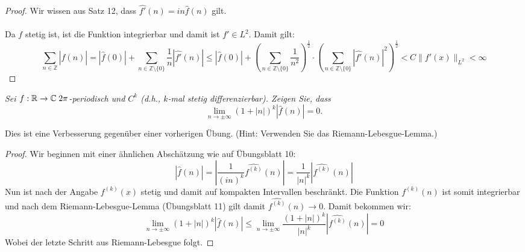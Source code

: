 \documentclass[11pt]{article}
\newcommand{\Z}{\mathbb{Z}}
\newenvironment{problem}[2][Beispiel]{
    \begin{trivlist}
        \item[\hskip \labelsep {\bfseries #1}\hskip \labelsep {\bfseries #2.}] \itshape}{
    \end{trivlist}\normalshape
}
\begin{document}
    \begin{proof}
        Wir wissen aus Satz 12, dass $\hat{f'}(n)=in\hat{f}(n)$ gilt.\\\\
        Da $f$ stetig ist, ist die Funktion integrierbar und damit ist $f'\in L^2$. Damit gilt:
        $$\sum_{n\in \Z}|\hat{f}(n)|=|\hat{f}(0)|+\sum_{n\in \Z\setminus\{0\}}\frac{1}{n}|\hat{f'}(n)|\leq
        |\hat{f}(0)|+\left(\sum_{n\in \Z\setminus\{0\}}\frac{1}{n^2}\right)^{\frac{1}{2}}\cdot
        \left(\sum_{n\in \Z\setminus\{0\}}|\hat{f'}(n)|^2\right)^{\frac{1}{2}} < C\|f'(x)\|_{L^2}<\infty$$
    \end{proof}

    \begin{problem}{3}
        Sei $f: \mathbb{R} \rightarrow \mathbb{C}\thickspace 2 \pi$-periodisch und $C^k$ (d.h., $k$-mal
        stetig differenzierbar). Zeigen Sie, dass
        $$
        \lim _{n \rightarrow \pm \infty}(1+|n|)^k|\hat{f}(n)|=0 .
        $$

        Dies ist eine Verbesserung gegenüber einer vorherigen Übung. (Hint: Verwenden Sie
        das Riemann-Lebesgue-Lemma.)
    \end{problem}

    \begin{proof}
        Wir beginnen mit einer ähnlichen Abschätzung wie auf Übungsblatt 10:
        $$|\hat{f}(n)|=\left|\frac{1}{(in)^k}\widehat{f^{(k)}}(n)\right|=
        \frac{1}{|n|^k }|\widehat{f^{(k)}}(n)|$$
        Nun ist nach der Angabe $f^{(k)}(x)$ stetig und damit auf kompakten Intervallen beschränkt.
        Die Funktion $f^{(k)}(n)$ ist somit integrierbar und nach dem Riemann-Lebesgue-Lemma (Übungsblatt
        11) gilt damit
        $\widehat{f^{(k)}}(n)\to 0$. Damit bekommen wir:
        $$\lim _{n \rightarrow \pm \infty}(1+|n|)^k|\hat{f}(n)|\leq \lim _{n \rightarrow \pm \infty}
        \frac{(1+|n|)^k}{|n|^k}\left|\widehat{f^{(k)}}(n)\right|=0$$
        Wobei der letzte Schritt aus Riemann-Lebesgue folgt.
    \end{proof}
\end{document}
